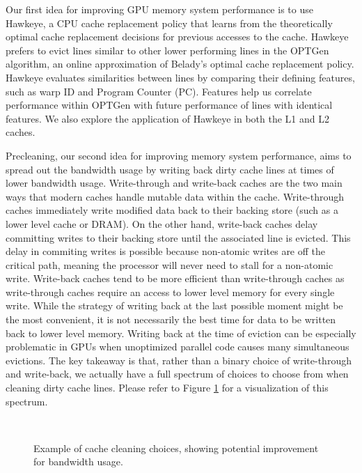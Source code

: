 Our first idea for improving GPU memory system performance is to use Hawkeye, a CPU cache replacement policy that learns from the theoretically optimal cache replacement decisions for previous accesses to the cache. Hawkeye prefers to evict lines similar to other lower performing lines in the OPTGen algorithm, an online approximation of Belady’s optimal cache replacement policy. Hawkeye evaluates similarities between lines by comparing their defining features, such as warp ID and Program Counter (PC). Features help us correlate performance within OPTGen with future performance of lines with identical features. We also explore the application of Hawkeye in both the L1 and L2 caches.

Precleaning, our second idea for improving memory system performance, aims to spread out the bandwidth usage by writing back dirty cache lines at times of lower bandwidth usage. Write-through and write-back caches are the two main ways that modern caches handle mutable data within the cache. Write-through caches immediately write modified data back to their backing store (such as a lower level cache or DRAM). On the other hand, write-back caches delay committing writes to their backing store until the associated line is evicted. This delay in commiting writes is possible because non-atomic writes are off the critical path, meaning the processor will never need to stall for a non-atomic write. Write-back caches tend to be more efficient than write-through caches as write-through caches require an access to lower level memory for every single write. While the strategy of writing back at the last possible moment might be the most convenient, it is not necessarily the best time for data to be written back to lower level memory. Writing back at the time of eviction can be especially problematic in GPUs when unoptimized parallel code causes many simultaneous evictions. The key takeaway is that, rather than a binary choice of write-through and write-back, we actually have a full spectrum of choices to choose from when cleaning dirty cache lines. Please refer to Figure \ref{f:bandwidth_optimal} for a visualization of this spectrum.

\begin{figure}[htb]
\begin{center}
\ 
\caption{Example of cache cleaning choices, showing potential improvement for bandwidth usage.}
\label{f:bandwidth_optimal}
\end{center}
\end{figure}
%

